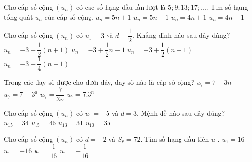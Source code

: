 \begin{ex}%
	Cho cấp số cộng $\left(u_n\right)$ có các số hạng đầu lần lượt là $5; 9; 13; 17;...$. Tìm số hạng tổng quát $u_n$ của cấp số cộng.
	\choice
	{$u_n=5n+1$}
	{$u_n=5n-1$}
	{\True $u_n=4n+1$}
	{$u_n=4n-1$}
\end{ex}
\begin{ex}%
	Cho cấp số cộng $\left(u_n\right)$ có $u_1=3$ và $d=\dfrac{1}{2}$. Khẳng định nào sau đây đúng?
	\choice
	{$u_n=-3+\dfrac{1}{2}(n+1)$}
	{$u_n=-3+\dfrac{1}{2}n-1$}
	{\True $u_n=-3+\dfrac{1}{2}(n-1)$}
	{$u_n=-3+\dfrac{1}{4}(n-1)$}
\end{ex}
\begin{ex}%
	Trong các dãy số được cho dưới đây, dãy số nào là cấp số cộng?
	\choice
	{\True $u_7=7-3n$}
	{$u_7=7-3^n$}
	{$u_7=\dfrac{7}{3n}$}
	{$u_7=7.3^n$}
\end{ex}
\begin{ex}%
	Cho cấp số cộng $\left(u_n\right)$ có $u_1=-5$ và $d=3$. Mệnh đề nào sau đây đúng?
	\choice
	{$u_{15}=34$}
	{$u_{15}=45$}
	{\True $u_{13}=31$}
	{$u_{10}=35$}
\end{ex}
\begin{ex}%
	Cho cấp số cộng $\left(u_n\right)$ có $d=-2$ và $S_8=72$. Tìm số hạng đầu tiên $u_1$.
	\choice
	{\True $u_1=16$}
	{$u_1=-16$}
	{$u_1=\dfrac{1}{16}$}
	{$u_1=-\dfrac{1}{16}$}
\end{ex}
